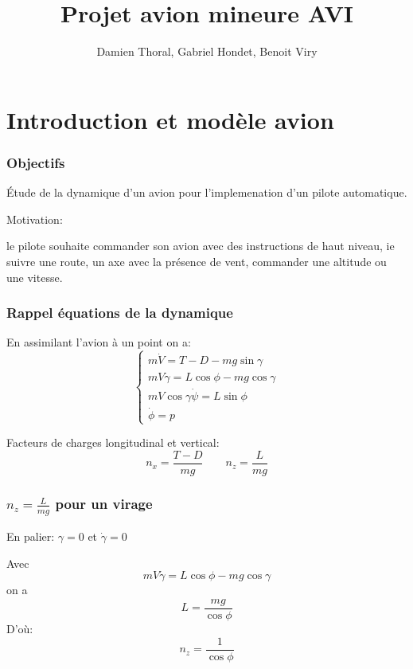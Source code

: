 \documentclass[tikz, footheight=2em]{beamer}
\title{Projet avion mineure AVI}
\author{Damien Thoral, Gabriel Hondet, Benoit Viry}
\date{}
\begin{document}
\frame{\titlepage}

\section{Introduction et modèle avion}

\begin{frame}
    \frametitle{Objectifs} \pause{}
    \begin{center}
        Étude de la dynamique d'un avion pour l'implemenation d'un pilote
        automatique.
    \end{center} \pause{}
    Motivation:
    \begin{center}
        le pilote souhaite commander son avion avec des instructions de haut
        niveau, ie suivre une route, un axe avec la présence de vent, commander
        une altitude ou une vitesse.
    \end{center}
\end{frame}

\begin{frame}
    \frametitle{Rappel équations de la dynamique} \pause{}
    En assimilant l'avion à un point on a:
    \[
    \left \{
    \begin{array}{l}
        m\dot{V} = T - D - mg\sin \gamma \\
        mV\dot{\gamma} = L\cos \phi - mg \cos \gamma \\
        mV \cos \gamma \dot{\psi} = L \sin \phi \\
        \dot{\phi} = p
    \end{array}
    \right.
    \] \pause{}

    Facteurs de charges longitudinal et vertical:
    \[
    n_x = \frac{T - D}{mg} \qquad n_z = \frac{L}{mg}
    \] \pause{}
    \begin{center}
    \end{center}
\end{frame}

\begin{frame}
    \frametitle{\(n_z = \frac{L}{mg}\) pour un virage}\pause{}
    En palier: \(\gamma = 0\) et \(\dot{\gamma} = 0\) \pause{}

    Avec \[ mV\dot{\gamma} = L\cos \phi - mg \cos \gamma \]
    on a \[ L=\frac{mg}{\cos \phi}\] \pause{}
    D'où:\[ \boxed{n_z = \frac{1}{\cos \phi}}\]
\end{frame}
\end{document}
